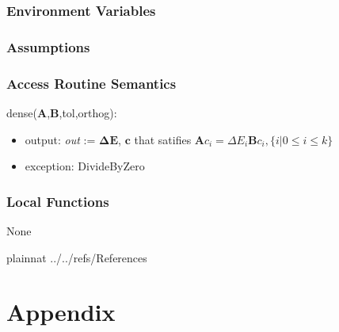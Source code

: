 \documentclass[12pt, titlepage]{article}
\begin{document}

\subsubsection{Environment Variables}


\subsubsection{Assumptions}


\subsubsection{Access Routine Semantics}

\noindent dense($\textbf{A}$,$\textbf{B}$,tol,orthog):
\begin{itemize}
	\item output: \textit{out} := $\boldsymbol{\Delta E}$, $\boldsymbol{c}$ 
	that satifies $\boldsymbol{A}c_i=\Delta E_i \boldsymbol{B} c_i, \{i|0\le i 
	\le k\} $
	\item exception: DivideByZero 
\end{itemize}

%

\subsubsection{Local Functions}

None

\newpage

 {plainnat}
 {../../refs/References}

\newpage

\section{Appendix} \label{Appendix}

\end{document}
